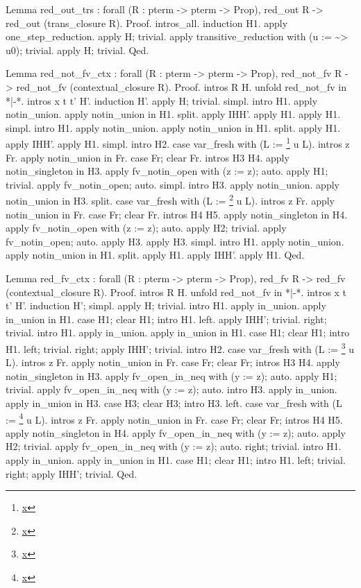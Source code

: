 \documentclass[12pt]{report}
\begin{document}
Lemma red\_out\_trs : forall (R : pterm -> pterm -> Prop),
  red\_out R -> red\_out (trans\_closure R).
Proof.
 intros\_all. induction H1.
 apply one\_step\_reduction. apply H; trivial.
 apply transitive\_reduction with (u :=  \~{}> u0); trivial.
 apply H; trivial.
Qed.


Lemma red\_not\_fv\_ctx : forall (R : pterm -> pterm -> Prop),
  red\_not\_fv R -> red\_not\_fv (contextual\_closure R).
Proof.
 intros R H. unfold red\_not\_fv in *|-*.
 intros x t t' H'. induction H'.
 apply H; trivial. 
 simpl. intro H1.
 apply notin\_union. apply notin\_union in H1.
 split. apply IHH'. apply H1. apply H1.
 simpl. intro H1.
 apply notin\_union. apply notin\_union in H1.
 split. apply H1. apply IHH'. apply H1.
 simpl. intro H2. case var\_fresh with (L := \footnote{\url{x}} u L).
 intros z Fr. apply notin\_union in Fr. case Fr; clear Fr.
 intros H3 H4. apply notin\_singleton in H3.
 apply fv\_notin\_open with (z := z); auto. apply H1; trivial.
 apply fv\_notin\_open; auto.
 simpl. intro H3.
 apply notin\_union. apply notin\_union in H3.
 split. case var\_fresh with (L := \footnote{\url{x}} u L).
 intros z Fr. apply notin\_union in Fr. case Fr; clear Fr.
 intros H4 H5. apply notin\_singleton in H4.
 apply fv\_notin\_open with (z := z); auto. apply H2; trivial.
 apply fv\_notin\_open; auto. apply H3. apply H3.
 simpl. intro H1.
 apply notin\_union. apply notin\_union in H1.
 split. apply H1. apply IHH'. apply H1.
Qed.


Lemma red\_fv\_ctx : forall (R : pterm -> pterm -> Prop),
  red\_fv R -> red\_fv (contextual\_closure R).
Proof.
 intros R H. unfold red\_not\_fv in *|-*.
 intros x t t' H'. induction H'; simpl.
 apply H; trivial. intro H1.
 apply in\_union. apply in\_union in H1.
 case H1; clear H1; intro H1. 
 left. apply IHH'; trivial. right; trivial. intro H1.
 apply in\_union. apply in\_union in H1.
 case H1; clear H1; intro H1.
 left; trivial. right; apply IHH'; trivial. intro H2.
 case var\_fresh with (L := \footnote{\url{x}} u L). intros z Fr.
 apply notin\_union in Fr. case Fr; clear Fr; intros H3 H4.
 apply notin\_singleton in H3. apply fv\_open\_in\_neq with (y := z); auto.
 apply H1; trivial. apply fv\_open\_in\_neq with (y := z); auto.
 intro H3. apply in\_union. apply in\_union in H3.
 case H3; clear H3; intro H3. left.
 case var\_fresh with (L := \footnote{\url{x}} u L). intros z Fr.
 apply notin\_union in Fr. case Fr; clear Fr; intros H4 H5.
 apply notin\_singleton in H4. apply fv\_open\_in\_neq with (y := z); auto.
 apply H2; trivial. apply fv\_open\_in\_neq with (y := z); auto. right; trivial.
 intro H1. apply in\_union. apply in\_union in H1.
 case H1; clear H1; intro H1. left; trivial. right; apply IHH'; trivial.  
Qed.
\end{document}
